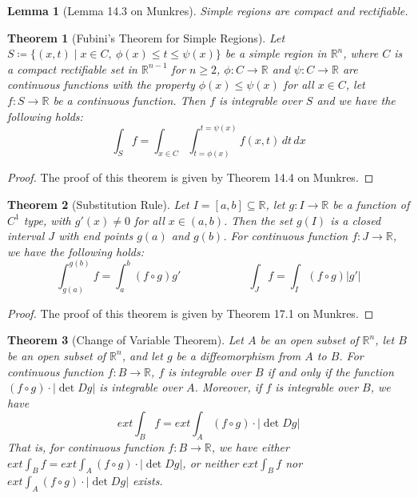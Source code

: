 \documentclass[11pt,oneside]{book}
\theoremstyle{break}
\theoremstyle{break}
\newtheorem{thm}{Theorem}[section]
\newtheorem{lem}{Lemma}[thm]
\newcommand{\R}{\mathbb{R}}
\begin{document}
\begin{lem}[Lemma 14.3 on Munkres]
Simple regions are compact and rectifiable.
\end{lem}

\begin{thm}[Fubini's Theorem for Simple Regions]
Let $S\coloneqq \{(x,t) \mid x \in C,\ \phi(x) \leq t \leq \psi(x)\}$ be a simple region in $\R^n$, where $C$ is a compact rectifiable set in $\R^{n-1}$ for $n \geq 2$, $\phi:C \to \R$ and $\psi:C \to \R$ are continuous functions with the property $\phi(x) \leq \psi(x)$ for all $x \in C$, let $f:S \to \R$ be a continuous function. Then $f$ is integrable over $S$ and we have the following holds: 
$$\int_S f = \int_{x \in C} \int_{t=\phi(x)}^{t=\psi(x)} f(x,t)\, dt\, dx$$
\end{thm}
\begin{proof}
The proof of this theorem is given by Theorem 14.4 on Munkres.
\end{proof}

\begin{thm}[Substitution Rule]
Let $I = [a,b]\subseteq \R$, let $g:I \to \R$ be a function of $C^1$ type, with $g'(x) \neq 0$ for all $x \in (a,b)$. Then the set $g(I)$ is a closed interval $J$ with end points $g(a)$ and $g(b)$. For continuous function $f:J \to \R$, we have the following holds:
$$\int_{g(a)}^{g(b)} f = \int_a^b (f\circ g) g'\qquad\qquad\qquad \int_J f = \int_I (f\circ g)|g'|$$
\end{thm}
\begin{proof}
The proof of this theorem is given by Theorem 17.1 on Munkres.
\end{proof}


\begin{thm}[Change of Variable Theorem]
Let $A$ be an open subset of $\R^n$, let $B$ be an open subset of $\R^n$, and let $g$ be a diffeomorphism from $A$ to $B$. For continuous function $f:B\to \R$, $f$ is integrable over $B$ if and only if the function $(f\circ g) \cdot |\det Dg|$ is integrable over $A$. Moreover, if $f$ is integrable over $B$, we have $$ext \int_B f = ext \int_A (f\circ g) \cdot |\det Dg|$$ 
That is, for continuous function $f:B \to \R$, we have either $ext \int_B f = ext \int_A (f\circ g) \cdot |\det Dg|$, or neither $ext \int_B f$ nor $ext \int_A (f\circ g) \cdot |\det Dg|$ exists.
\end{thm}
\end{document}
